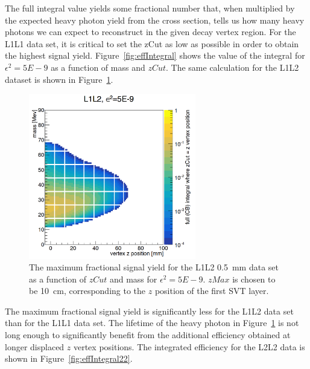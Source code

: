 The full integral value yields some fractional number that, when multiplied by the expected heavy photon yield from the cross section, tells us how many heavy photons we can expect to reconstruct in the given decay vertex region. For the L1L1 data set, it is critical to set the zCut as low as possible in order to obtain the highest signal yield. Figure~\ref{fig:effIntegral} shows the value of the integral for $\epsilon^{2} = 5E-9$ as a function of mass and $zCut$. The same calculation for the L1L2 dataset is shown in Figure~\ref{fig:effIntegral12}.

\begin{figure}[htb]
  \centering
      \includegraphics[width=0.65\textwidth]{pics/searching/integralEff12.png}
  \caption[Integral as a function of mass and $zCut$ for L1L2]{The maximum fractional signal yield for the L1L2 0.5~mm data set as a function of $zCut$ and mass for $\epsilon^2=5E-9$. $zMax$ is chosen to be 10~cm, corresponding to the $z$ position of the first SVT layer. }
  \label{fig:effIntegral12}
\end{figure}

The maximum fractional signal yield is significantly less for the L1L2 data set than for the L1L1 data set. The lifetime of the heavy photon in Figure~\ref{fig:effIntegral12} is not long enough to significantly benefit from the additional efficiency obtained at longer displaced $z$ vertex positions. The integrated efficiency for the L2L2 data is shown in Figure~\ref{fig:effIntegral22}.

